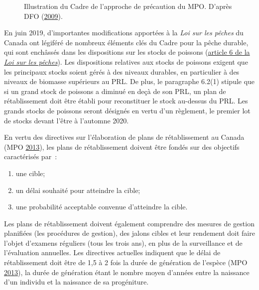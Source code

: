 \documentclass[french,11pt]{book}
\begin{document}
\begin{figure}[htb]

{\centering {} 

}

\caption{Illustration du Cadre de l'approche de précaution du MPO. D'après DFO (\protect\hyperlink{ref-dfo2009}{2009}).}\label{fig:pa-illustration}
\end{figure}
En juin 2019, d'importantes modifications apportées à la \emph{Loi sur les pêches} du Canada ont légiféré de nombreux éléments clés du Cadre pour la pêche durable, qui sont enchâssés dans les dispositions sur les stocks de poissons (\href{https://laws-lois.justice.gc.ca/fra/lois/f-14/page-3.html\#h-1175547}{article 6 de la \emph{Loi sur les pêches}}). Les dispositions relatives aux stocks de poissons exigent que les principaux stocks soient gérés à des niveaux durables, en particulier à des niveaux de biomasse supérieurs au PRL. De plus, le paragraphe 6.2(1) stipule que si un grand stock de poissons a diminué en deçà de son PRL, un plan de rétablissement doit être établi pour reconstituer le stock au-dessus du PRL. Les grands stocks de poissons seront désignés en vertu d'un règlement, le premier lot de stocks devant l'être à l'automne 2020.

En vertu des directives sur l'élaboration de plans de rétablissement au Canada (MPO \protect\hyperlink{ref-dfo2013}{2013}), les plans de rétablissement doivent être fondés sur des objectifs caractérisés par~:
\begin{enumerate}
\def\labelenumi{\arabic{enumi}.}

\item
  une cible;
\item
  un délai souhaité pour atteindre la cible;
\item
  une probabilité acceptable convenue d'atteindre la cible.
\end{enumerate}
Les plans de rétablissement doivent également comprendre des mesures de gestion planifiées (les procédures de gestion), des jalons cibles et leur rendement doit faire l'objet d'examens réguliers (tous les trois ans), en plus de la surveillance et de l'évaluation annuelles. Les directives actuelles indiquent que le délai de rétablissement doit être de 1,5 à 2 fois la durée de génération de l'espèce (MPO \protect\hyperlink{ref-dfo2013}{2013}), la durée de génération étant le nombre moyen d'années entre la naissance d'un individu et la naissance de sa progéniture.
\end{document}
